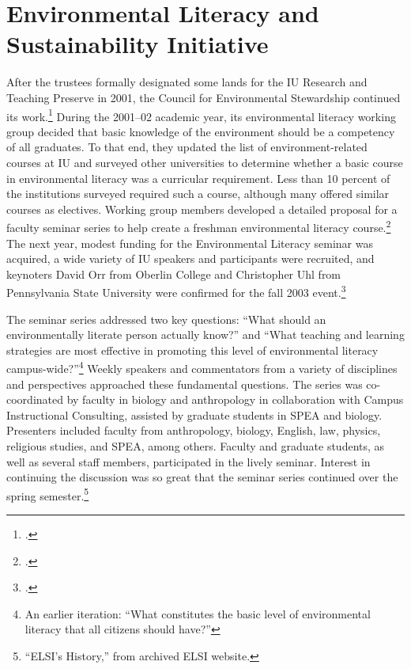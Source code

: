 \documentclass[
  american,
  letterpaper,
]{scrreprt}
\begin{document}
\section{Environmental Literacy and Sustainability
Initiative}\label{environmental-literacy-and-sustainability-initiative}

After the trustees formally designated some lands for the IU Research
and Teaching Preserve in 2001, the Council for Environmental Stewardship
continued its work.\footnote{.}
During the 2001--02 academic year, its environmental literacy working
group decided that basic knowledge of the environment should be a
competency of all graduates. To that end, they updated the list of
environment-related courses at IU and surveyed other universities to
determine whether a basic course in environmental literacy was a
curricular requirement. Less than 10 percent of the institutions
surveyed required such a course, although many offered similar courses
as electives. Working group members developed a detailed proposal for a
faculty seminar series to help create a freshman environmental literacy
course.\footnote{.} The next year,
modest funding for the Environmental Literacy seminar was acquired, a
wide variety of IU speakers and participants were recruited, and
keynoters David Orr from Oberlin College and Christopher Uhl from
Pennsylvania State University were confirmed for the fall 2003
event.\footnote{.}

The seminar series addressed two key questions: ``What should an
environmentally literate person actually know?'' and ``What teaching and
learning strategies are most effective in promoting this level of
environmental literacy campus-wide?''\footnote{An earlier iteration:
  ``What constitutes the basic level of environmental literacy that all
  citizens should have?''} Weekly speakers and commentators from a
variety of disciplines and perspectives approached these fundamental
questions. The series was co-coordinated by faculty in biology and
anthropology in collaboration with Campus Instructional Consulting,
assisted by graduate students in SPEA and biology. Presenters included
faculty from anthropology, biology, English, law, physics, religious
studies, and SPEA, among others. Faculty and graduate students, as well
as several staff members, participated in the lively seminar. Interest
in continuing the discussion was so great that the seminar series
continued over the spring semester.\footnote{``ELSI's History,'' from
  archived ELSI website.}
\end{document}
